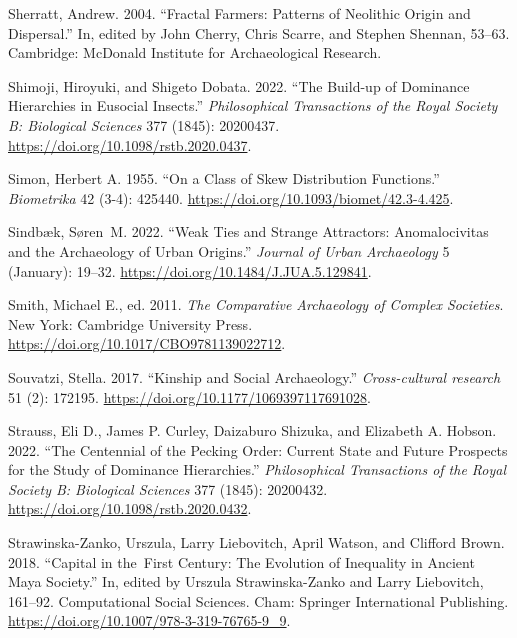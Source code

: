 \documentclass[
  12pt,
  a4paper, twoside]{book}
\newlength{\cslhangindent}
\newlength{\cslentryspacingunit} %
\newenvironment{CSLReferences}[2] %
 {%
  \setlength{\parindent}{0pt}
  \ifodd #1
  \let\oldpar\par
  \def\par{\hangindent=\cslhangindent\oldpar}
  \fi
  \setlength{\parskip}{#2\cslentryspacingunit}
 }%
 {}
\begin{document}
\begin{CSLReferences}{1}{0}
\leavevmode{}%
Sherratt, Andrew. 2004. {``Fractal Farmers: Patterns of Neolithic Origin and Dispersal.''} In, edited by John Cherry, Chris Scarre, and Stephen Shennan, 53--63. Cambridge: McDonald Institute for Archaeological Research.

\leavevmode{}%
Shimoji, Hiroyuki, and Shigeto Dobata. 2022. {``The Build-up of Dominance Hierarchies in Eusocial Insects.''} \emph{Philosophical Transactions of the Royal Society B: Biological Sciences} 377 (1845): 20200437. \url{https://doi.org/10.1098/rstb.2020.0437}.

\leavevmode{}%
Simon, Herbert A. 1955. {``On a Class of Skew Distribution Functions.''} \emph{Biometrika} 42 (3-4): 425440. \url{https://doi.org/10.1093/biomet/42.3-4.425}.

\leavevmode{}%
Sindbæk, Søren~M. 2022. {``Weak Ties and Strange Attractors: Anomalocivitas and the Archaeology of Urban Origins.''} \emph{Journal of Urban Archaeology} 5 (January): 19--32. \url{https://doi.org/10.1484/J.JUA.5.129841}.

\leavevmode{}%
Smith, Michael E., ed. 2011. \emph{The Comparative Archaeology of Complex Societies}. New York: Cambridge University Press. \url{https://doi.org/10.1017/CBO9781139022712}.

\leavevmode{}%
Souvatzi, Stella. 2017. {``Kinship and Social Archaeology.''} \emph{Cross-cultural research} 51 (2): 172195. \url{https://doi.org/10.1177/1069397117691028}.

\leavevmode{}%
Strauss, Eli D., James P. Curley, Daizaburo Shizuka, and Elizabeth A. Hobson. 2022. {``The Centennial of the Pecking Order: Current State and Future Prospects for the Study of Dominance Hierarchies.''} \emph{Philosophical Transactions of the Royal Society B: Biological Sciences} 377 (1845): 20200432. \url{https://doi.org/10.1098/rstb.2020.0432}.

\leavevmode{}%
Strawinska-Zanko, Urszula, Larry Liebovitch, April Watson, and Clifford Brown. 2018. {``Capital in the~First Century: The Evolution of Inequality in Ancient Maya Society.''} In, edited by Urszula Strawinska-Zanko and Larry Liebovitch, 161--92. Computational Social Sciences. Cham: Springer International Publishing. \url{https://doi.org/10.1007/978-3-319-76765-9_9}.


\end{CSLReferences}
\end{document}
